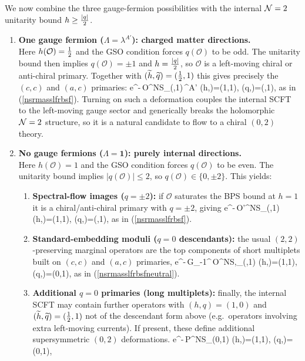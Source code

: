 \documentclass[12pt]{article}
\newcommand{\wt}[1]{\widetilde{#1}}
\newcommand{\mc}[1]{\mathcal{#1}}
\begin{document}
We now combine the three gauge-fermion possibilities with the internal ${\cal N}=2$ unitarity bound $h\ge {|q|\over 2}$.
\begin{enumerate}
\item {\bf One gauge fermion ($\Lambda=\lambda^{A'}$): charged matter directions.}\\
Here $h(\mc{O})={1\over 2}$ and the GSO condition forces $q(\mc{O})$ to be odd. The unitarity bound then implies $q(\mc{O})=\pm 1$ and $h={|q|\over 2}$, so $\mc{O}$ is a left-moving chiral or anti-chiral primary. Together with $(\wt h,\wt q)=({1\over 2},1)$ this gives precisely the $(c,c)$ and $(a,c)$ primaries:
\ie\label{defmatter}
e^{-{\wt\phi}}\,{\cal O}^{\rm NS}_{(,1)}\,\lambda^{A'} \qquad (h,\wt h)=\Big({1},{1}\Big), \quad (q,\wt q)=(,1),
\fe
as in (\ref{nsrmasslfrbsf}). Turning on such a deformation couples the internal SCFT to the left-moving gauge sector and generically breaks the holomorphic ${\cal N}=2$ structure, so it is a natural candidate to flow to a chiral $(0,2)$ theory.

\item {\bf No gauge fermions ($\Lambda=\mathbf{1}$): purely internal directions.}\\
Here $h(\mc{O})=1$ and the GSO condition forces $q(\mc{O})$ to be even. The unitarity bound implies $|q(\mc{O})|\le 2$, so $q(\mc{O})\in\{0,\pm 2\}$. This yields:
\begin{enumerate}
\item {\bf Spectral-flow images ($q=\pm 2$):} if $\mc{O}$ saturates the BPS bound at $h=1$ it is a chiral/anti-chiral primary with $q=\pm 2$, giving
\ie\label{defq2}
e^{-{\wt\phi}}\,{\cal O}'^{\rm NS}_{(,1)} \qquad (h,\wt h)=(1,{1}), \quad (q,\wt q)=(,1),
\fe
as in (\ref{nsrmasslfrbsf}).
\item {\bf Standard-embedding moduli ($q=0$ descendants):} the usual $(2,2)$-preserving marginal operators are the top components of short multiplets built on $(c,c)$ and $(a,c)$ primaries,
\ie\label{defmoduli}
e^{-{\wt\phi}}\,G_{-{1}}^\pm\,{\cal O}^{{\rm NS},\mp}_{(,1)} \qquad (h,\wt h)=(1,{1}), \quad (q,\wt q)=(0,1),
\fe
as in (\ref{nsrmasslfrbsfneutral}).
\item {\bf Additional $q=0$ primaries (long multiplets):} finally, the internal SCFT may contain further operators with $(h,q)=(1,0)$ and $(\wt h,\wt q)=({1\over 2},1)$ not of the descendant form above (e.g.\ operators involving extra left-moving currents). If present, these define additional supersymmetric $(0,2)$ deformations.
\ie\label{defq0primary}
e^{-{\wt\phi}}\,{\cal P}^{\rm NS}_{(0,1)} \qquad (h,\wt h)=\Big(1,{1}\Big), \quad (q,\wt q)=(0,1),
\fe
\end{enumerate}


\end{enumerate}
\end{document}
